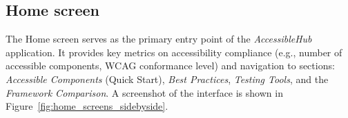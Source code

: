 \subsection{Home screen}

The Home screen serves as the primary entry point of the \textit{AccessibleHub} application. It provides key metrics on accessibility compliance (e.g., number of accessible components, WCAG conformance level) and navigation to sections: \textit{Accessible Components} (Quick Start), \textit{Best Practices}, \textit{Testing Tools}, and the \textit{Framework Comparison}. A screenshot of the interface is shown in Figure~\ref{fig:home_screens_sidebyside}.

\begin{figure}[ht]
    \centering
    \begin{subfigure}[b]{0.37\textwidth}
        \centering

\end{subfigure}
\end{figure}
